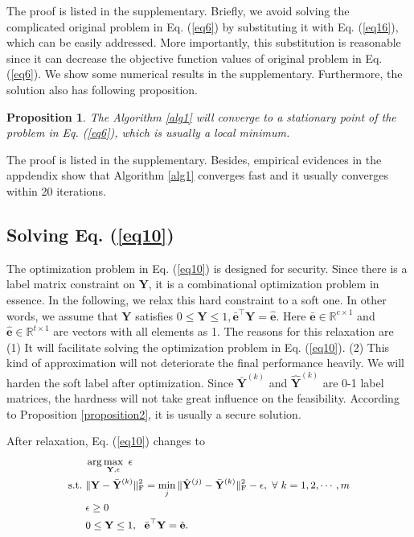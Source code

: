 \documentclass[10pt,journal,compsoc]{IEEEtran}
\newtheorem{theorem}{Proposition}
\begin{document}
The proof is listed in the supplementary. Briefly, we avoid solving the complicated original problem in Eq. (\ref{eq6}) by substituting it with Eq. (\ref{eq16}), which can be easily addressed. More importantly, this substitution is reasonable since it can decrease the objective function values of original problem in Eq. (\ref{eq6}). We show some numerical results in the supplementary. Furthermore, the solution also has following proposition.
\begin{theorem} \label{proposition4}
The Algorithm \ref{alg1} will converge to a stationary point of the problem in Eq. (\ref{eq6}), which is usually a local minimum.
\end{theorem}

The proof is listed in the supplementary. Besides, empirical evidences in the appdendix show that Algorithm \ref{alg1} converges fast and it usually converges within 20 iterations.


\subsection{Solving Eq. (\ref{eq10})}

The optimization problem in Eq. (\ref{eq10}) is designed for security. Since there is a label matrix constraint on $\mathbf{Y}$, it is a combinational optimization problem in essence. In the following, we relax this hard constraint to a soft one. In other words, we assume that $\mathbf{Y}$ satisfies $0 \leq \mathbf{Y} \leq 1, \bar{\mathbf{e}}^\top \mathbf{Y} = \hat{\mathbf{e}}$. Here $\bar{\mathbf{e}} \in \mathbb{R}^{c\times 1}$ and $\hat{\mathbf{e}} \in \mathbb{R}^{t\times 1}$ are vectors with all elements as 1. The reasons for this relaxation are (1) It will facilitate solving the optimization problem in Eq. (\ref{eq10}). (2) This kind of approximation will not deteriorate the final performance heavily. We will harden the soft label after optimization. Since $\bar{\mathbf{Y}}^{(k)}$ and $\hat{\mathbf{Y}}^{(k)}$ are 0-1 label matrices, the hardness will not take great influence on the feasibility. According to Proposition \ref{proposition2}, it is usually a secure solution.

After relaxation, Eq. (\ref{eq10}) changes to
\begin{equation}
\label{eq31}
\small{
\begin{split}
          & \arg\max_{\mathbf{Y}, \epsilon}~\epsilon\\
\rm{s.t.~} &\|\mathbf{Y}- \bar{\mathbf{Y}}^{(k)}\|_{\rm{F}}^2 = \min_j \|\hat{\mathbf{Y}}^{(j)}- \bar{\mathbf{Y}}^{(k)}\|_{\rm{F}}^2-\epsilon, ~\forall~k=1,2,\cdots, m\\
          & \epsilon \geq 0 \\
          & 0 \leq \mathbf{Y} \leq 1,~~\bar{\mathbf{e}}^\top \mathbf{Y} = \hat{\mathbf{e}}.
\end{split}}
\end{equation}
\end{document}
